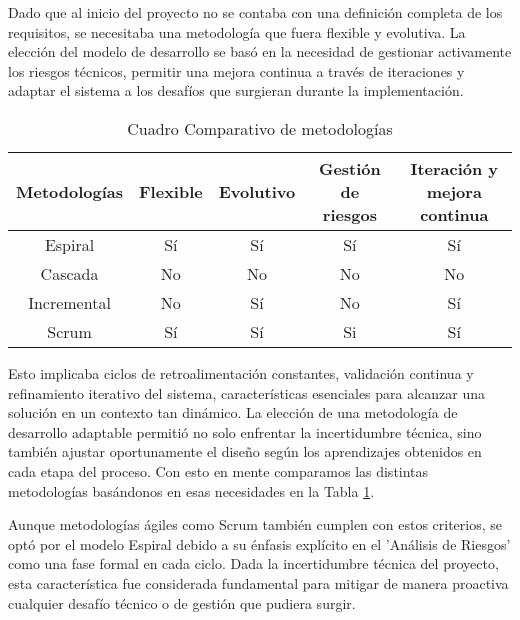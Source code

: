 
Dado que al inicio del proyecto no se contaba con una definición completa de los requisitos, se necesitaba una metodología que fuera flexible y evolutiva. La elección del modelo de desarrollo se basó en la necesidad de gestionar activamente los riesgos técnicos, permitir una mejora continua a través de iteraciones y adaptar el sistema a los desafíos que surgieran durante la implementación.

\begin{table}[ht]
  \doublespacing
  \centering
  \small
  \begin{tabular}{ c c c c c }
    \hline
    Metodologías & Flexible & Evolutivo & Gestión de riesgos & Iteración y mejora continua \\
    \hline
    Espiral      & Sí       & Sí        & Sí                 & Sí                          \\
    Cascada      & No       & No        & No                 & No                          \\
    Incremental  & No       & Sí        & No                 & Sí                          \\
    Scrum        & Sí       & Sí        & Si                 & Sí                          \\
    \hline
  \end{tabular}
  \caption{Cuadro Comparativo de metodologías}
  \label{tab:comparative-methodologies}
\end{table}

Esto implicaba ciclos de retroalimentación constantes, validación continua y refinamiento iterativo del sistema, características esenciales para alcanzar una solución en un contexto tan dinámico. La elección de una metodología de desarrollo adaptable permitió no solo enfrentar la incertidumbre técnica, sino también ajustar oportunamente el diseño según los aprendizajes obtenidos en cada etapa del proceso. Con esto en mente comparamos las distintas metodologías basándonos en esas necesidades en la Tabla \ref{tab:comparative-methodologies}.

Aunque metodologías ágiles como Scrum también cumplen con estos criterios, se optó por el modelo Espiral debido a su énfasis explícito en el 'Análisis de Riesgos' como una fase formal en cada ciclo. Dada la incertidumbre técnica del proyecto, esta característica fue considerada fundamental para mitigar de manera proactiva cualquier desafío técnico o de gestión que pudiera surgir.

